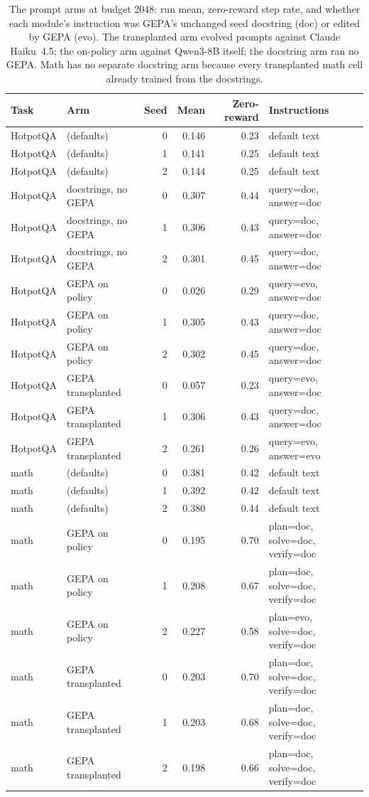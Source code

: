 \begin{table}[!htbp]
  \caption{The prompt arms at budget 2048: run mean, zero-reward step rate, and whether each module's instruction was GEPA's unchanged seed docstring (doc) or edited by GEPA (evo). The transplanted arm evolved prompts against Claude Haiku~4.5; the on-policy arm against Qwen3-8B itself; the docstring arm ran no GEPA. Math has no separate docstring arm because every transplanted math cell already trained from the docstrings.}
  \label{tab:promptcells}
  \centering
  \scriptsize
  \begin{tabular}{@{}llrrrl@{}}
    \toprule
    Task & Arm & Seed & Mean & Zero-reward & Instructions \\
    \midrule
    HotpotQA & \drgrpo{} (defaults) & 0 & 0.146 & 0.23 & default text \\
    HotpotQA & \drgrpo{} (defaults) & 1 & 0.141 & 0.25 & default text \\
    HotpotQA & \drgrpo{} (defaults) & 2 & 0.144 & 0.25 & default text \\
    HotpotQA & docstrings, no GEPA & 0 & 0.307 & 0.44 & query=doc, answer=doc \\
    HotpotQA & docstrings, no GEPA & 1 & 0.306 & 0.43 & query=doc, answer=doc \\
    HotpotQA & docstrings, no GEPA & 2 & 0.301 & 0.45 & query=doc, answer=doc \\
    HotpotQA & GEPA on policy & 0 & 0.026 & 0.29 & query=evo, answer=doc \\
    HotpotQA & GEPA on policy & 1 & 0.305 & 0.43 & query=doc, answer=doc \\
    HotpotQA & GEPA on policy & 2 & 0.302 & 0.45 & query=doc, answer=doc \\
    HotpotQA & GEPA transplanted & 0 & 0.057 & 0.23 & query=evo, answer=doc \\
    HotpotQA & GEPA transplanted & 1 & 0.306 & 0.43 & query=doc, answer=doc \\
    HotpotQA & GEPA transplanted & 2 & 0.261 & 0.26 & query=evo, answer=evo \\
    \midrule
    math & \drgrpo{} (defaults) & 0 & 0.381 & 0.42 & default text \\
    math & \drgrpo{} (defaults) & 1 & 0.392 & 0.42 & default text \\
    math & \drgrpo{} (defaults) & 2 & 0.380 & 0.44 & default text \\
    math & GEPA on policy & 0 & 0.195 & 0.70 & plan=doc, solve=doc, verify=doc \\
    math & GEPA on policy & 1 & 0.208 & 0.67 & plan=doc, solve=doc, verify=doc \\
    math & GEPA on policy & 2 & 0.227 & 0.58 & plan=evo, solve=doc, verify=doc \\
    math & GEPA transplanted & 0 & 0.203 & 0.70 & plan=doc, solve=doc, verify=doc \\
    math & GEPA transplanted & 1 & 0.203 & 0.68 & plan=doc, solve=doc, verify=doc \\
    math & GEPA transplanted & 2 & 0.198 & 0.66 & plan=doc, solve=doc, verify=doc \\
    \bottomrule
  \end{tabular}
\end{table}
